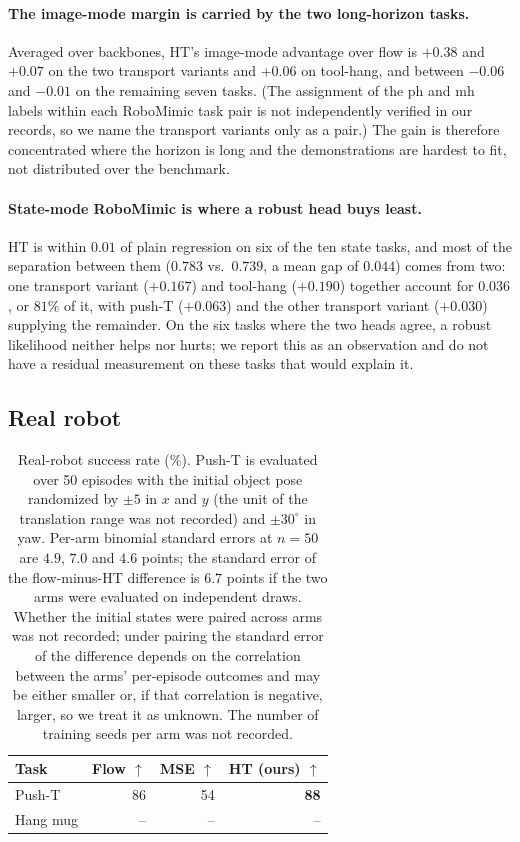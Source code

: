 \paragraph{The image-mode margin is carried by the two long-horizon tasks.}
Averaged over backbones, HT's image-mode advantage over flow is $+0.38$ and
$+0.07$ on the two transport variants and $+0.06$ on tool-hang, and between
$-0.06$ and $-0.01$ on the remaining seven tasks. (The assignment of the ph and
mh labels within each RoboMimic task pair is not independently verified in our
records, so we name the transport variants only as a pair.) The gain is therefore
concentrated where the horizon is long and the demonstrations are hardest to
fit, not distributed over the benchmark.

\paragraph{State-mode RoboMimic is where a robust head buys least.} HT is
within $0.01$ of plain regression on six of the ten state tasks, and most of the
separation between them ($0.783$ vs.\ $0.739$, a mean gap of $0.044$) comes from
two: one transport variant ($+0.167$) and tool-hang ($+0.190$) together account
for $0.036$, or $81\%$ of it, with push-T ($+0.063$) and the other transport
variant ($+0.030$) supplying the remainder. On the six tasks where the two heads agree, a robust
likelihood neither helps nor hurts; we report this as an observation and do not
have a residual measurement on these tasks that would explain it.

\subsection{Real robot}
\label{sec:exp:real}

\begin{table}[t]
\centering
\caption{Real-robot success rate (\%). Push-T is evaluated over 50 episodes
with the initial object pose randomized by $\pm 5$ in $x$ and $y$ (the unit of
the translation range was not recorded) and $\pm 30^\circ$ in yaw. Per-arm
binomial standard errors at $n = 50$ are $4.9$, $7.0$ and $4.6$ points; the
standard error of the flow-minus-HT difference is $6.7$ points if the two arms
were evaluated on independent draws. Whether the initial states were paired
across arms was not recorded; under pairing the standard error of the difference
depends on the correlation between the arms' per-episode outcomes and may be
either smaller or, if that correlation is negative, larger, so we treat it as
unknown. The number of
training seeds per arm was not recorded.}
\label{tab:real}
\begin{tabular}{lrrr}
\toprule
Task & Flow $\uparrow$ & MSE $\uparrow$ & HT (ours) $\uparrow$ \\
\midrule
Push-T   & 86 & 54 & \textbf{88} \\
Hang mug & -- & -- & -- \\
\bottomrule
\end{tabular}
\end{table}

